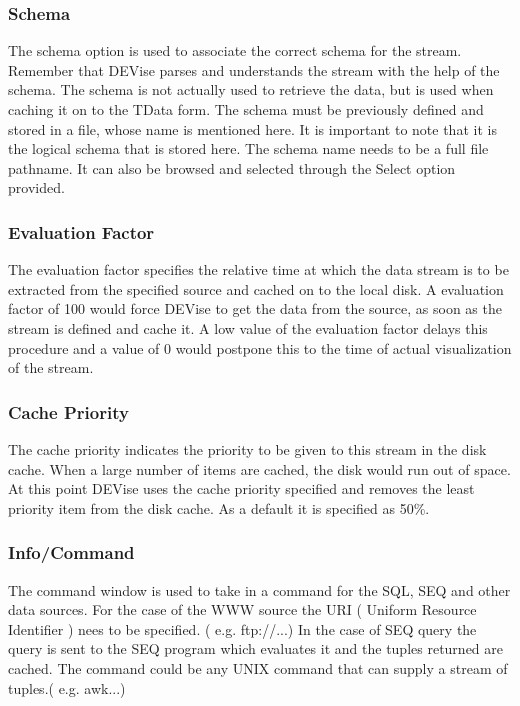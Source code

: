 \subsubsection{Schema}

The schema option is used to associate the correct schema for the stream. Remember that DEVise parses and understands the stream with the help of the schema. The schema is not actually used to retrieve the data, but is used when caching it on to the TData form. The schema must be previously defined and stored in a file, whose name is mentioned here. It is important to note that it is the logical schema that is stored here. The schema name needs to be a full file pathname. It can also be browsed and selected through the Select option provided.

\subsubsection{Evaluation Factor}

The evaluation factor specifies the relative time at which the data stream is to be extracted from the specified source and cached on to the local disk. A evaluation factor of 100 would force DEVise to get the data from the source, as soon as the stream is  defined and cache it. A low value of the evaluation factor delays this procedure and a value of 0 would postpone this to the time of actual visualization of the stream.

\subsubsection{Cache Priority}

The cache priority indicates the priority to be given to this stream in the disk cache. When a large number of items are cached, the disk would run out of space. At this point DEVise uses the cache priority specified and removes the least priority item from the disk cache. As a default it is specified as 50\%.

\subsubsection{Info/Command}

The command window is used to take in a command for the SQL, SEQ and other data sources. For the case of the WWW source the URI ( Uniform Resource Identifier ) nees to be specified. ( e.g. ftp://...) In the case of SEQ query the query is sent to the SEQ program which evaluates it and the tuples returned are cached. The command could be any UNIX command that can supply a stream of tuples.( e.g. awk...) 

